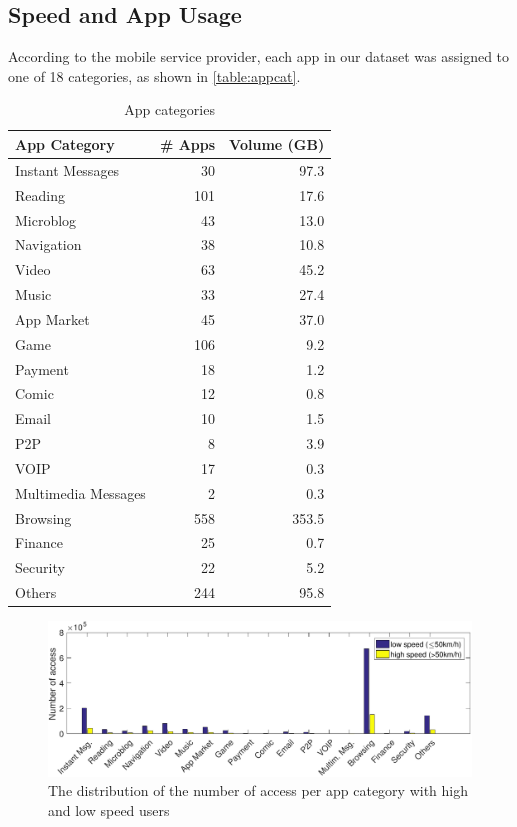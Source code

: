 \subsection{Speed and App Usage}

According to the mobile service provider, each app in our dataset was assigned to one of 18 categories, as shown in \autoref{table:appcat}.
\begin{table}[h]
	\centering
	\begin{tabular}{lrr}\hline
	App Category & \# Apps & Volume (GB) \\
    \hline
	Instant Messages & 30 & 97.3\\
	Reading & 101 & 17.6\\
	Microblog & 43 & 13.0\\
	Navigation  & 38 & 10.8\\
	Video  & 63 & 45.2\\
	Music  & 33 & 27.4\\
	App Market & 45 & 37.0\\
	Game  & 106 & 9.2\\
	Payment & 18 & 1.2\\
	Comic & 12 & 0.8\\
	Email & 10 & 1.5\\
	P2P & 8 & 3.9\\
	VOIP  & 17 & 0.3\\
	Multimedia Messages & 2 & 0.3\\
	Browsing & 558 & 353.5\\
	Finance  & 25 & 0.7\\
	Security  & 22 & 5.2\\
    Others  & 244 & 95.8\\
    \hline
	\end{tabular}
	\caption{App categories}
	\label{table:appcat}
\end{table}

\begin{figure}[h]
    \centering
    \includegraphics[width=\linewidth]{./figures/num_access_high_low_speed_8_6.pdf}
    \caption{The distribution of the number of access per app category with high and low speed users}
    \label{fig:speed_access_hl}
\end{figure}

